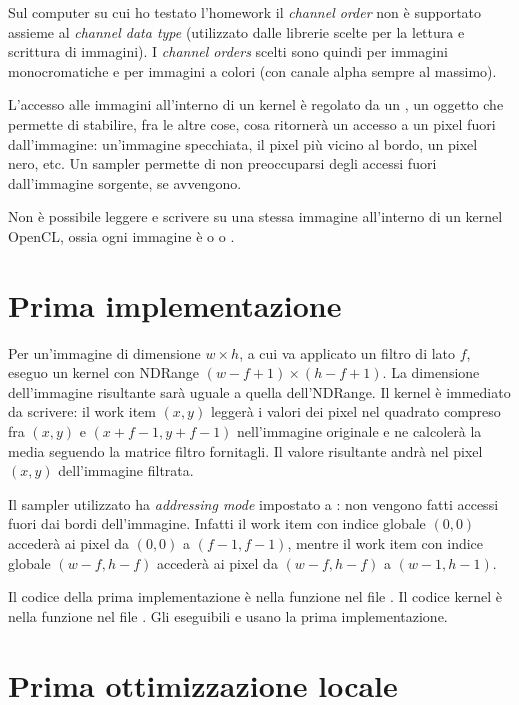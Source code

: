 \documentclass[10pt]{myarticle}
\begin{document}
Sul computer su cui ho testato l'homework il \emph{channel order}  non \`e supportato assieme al \emph{channel data type}  (utilizzato dalle librerie scelte per la lettura e scrittura di immagini).
I \emph{channel orders} scelti sono quindi  per immagini monocromatiche e  per immagini a colori (con canale alpha sempre al massimo).

L'accesso alle immagini all'interno di un kernel \`e regolato da un , un oggetto che permette di stabilire, fra le altre cose, cosa ritorner\`a un accesso a un pixel fuori dall'immagine: un'immagine specchiata, il pixel pi\`u vicino al bordo, un pixel nero, etc.
Un sampler permette di non preoccuparsi degli accessi fuori dall'immagine sorgente, se avvengono.

Non \`e possibile leggere e scrivere su una stessa immagine all'interno di un kernel OpenCL, ossia ogni immagine \`e o  o .

\section{Prima implementazione}

Per un'immagine di dimensione $w \times h$, a cui va applicato un filtro di lato $f$, eseguo un kernel con NDRange $(w - f + 1) \times (h - f + 1)$.
La dimensione dell'immagine risultante sar\`a uguale a quella dell'NDRange.
Il kernel \`e immediato da scrivere: il work item $(x,y)$ legger\`a i valori dei pixel nel quadrato compreso fra $(x, y)$ e $(x + f - 1, y + f - 1)$ nell'immagine originale e ne calcoler\`a la media seguendo la matrice filtro fornitagli.
Il valore risultante andr\`a nel pixel $(x,y)$ dell'immagine filtrata.

Il sampler utilizzato ha \emph{addressing mode} impostato a : non vengono fatti accessi fuori dai bordi dell'immagine.
Infatti il work item con indice globale $(0,0)$ acceder\`a ai pixel da $(0,0)$ a $(f-1,f-1)$, mentre il work item con indice globale $(w-f, h-f)$ acceder\`a ai pixel da $(w-f,h-f)$ a $(w-1,h-1)$.

Il codice della prima implementazione \`e nella funzione  nel file .
Il codice kernel \`e nella funzione  nel file .
Gli eseguibili  e  usano la prima implementazione.

\section{Prima ottimizzazione locale}
\end{document}
